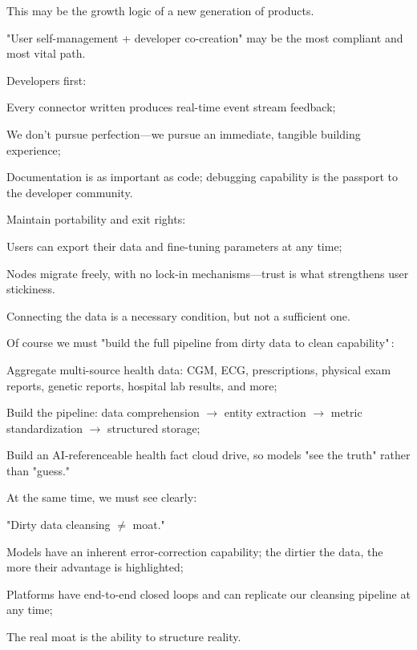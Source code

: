 This may be the growth logic of a new generation of products.

"User self-management + developer co-creation" may be the most compliant and most vital path.

\vspace{1em}

Developers first:

{\kaiti
Every connector written produces real-time event stream feedback;

We don't pursue perfection---we pursue an immediate, tangible building experience;

Documentation is as important as code; debugging capability is the passport to the developer community.
}

Maintain portability and exit rights:

{\kaiti
Users can export their data and fine-tuning parameters at any time;

Nodes migrate freely, with no lock-in mechanisms---trust is what strengthens user stickiness.
}

\vspace{1em}
Connecting the data is a necessary condition, but not a sufficient one.

Of course we must "build the full pipeline from dirty data to clean capability"\,:

{\kaiti
Aggregate multi-source health data: CGM, ECG, prescriptions, physical exam reports, genetic reports, hospital lab results, and more;

Build the pipeline: data comprehension $\to$ entity extraction $\to$ metric standardization $\to$ structured storage;

Build an AI-referenceable health fact cloud drive, so models "see the truth" rather than "guess."
}

\newpage

At the same time, we must see clearly:

\begin{myquote}
    "Dirty data cleansing $\neq$ moat."
\end{myquote}

Models have an inherent error-correction capability; the dirtier the data, the more their advantage is highlighted;

Platforms have end-to-end closed loops and can replicate our cleansing pipeline at any time;

The real moat is the ability to structure reality.

\vspace{1em}


